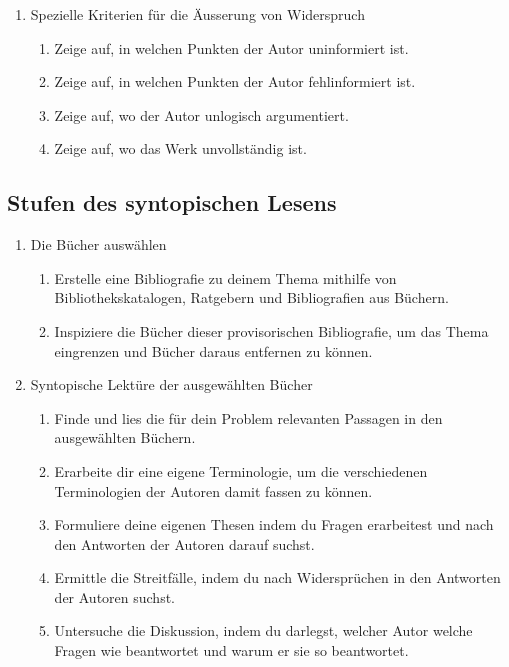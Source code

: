 \documentclass[a4paper,11pt]{scrartcl}
\begin{document}
\begin{itemize}
\begin{enumerate}
\begin{enumerate}
        \end{enumerate}
        \item Spezielle Kriterien für die Äusserung von Widerspruch
        \begin{enumerate}
            \item Zeige auf, in welchen Punkten der Autor uninformiert ist.
            \item Zeige auf, in welchen Punkten der Autor fehlinformiert ist.
            \item Zeige auf, wo der Autor unlogisch argumentiert.
            \item Zeige auf, wo das Werk unvollständig ist.
        \end{enumerate}
    \end{enumerate}
\end{itemize}

\subsection*{Stufen des syntopischen Lesens}

\begin{enumerate}
    \item Die Bücher auswählen
    \begin{enumerate}
        \item Erstelle eine Bibliografie zu deinem Thema mithilfe von Bibliothekskatalogen, Ratgebern und Bibliografien aus Büchern.
        \item Inspiziere die Bücher dieser provisorischen Bibliografie, um das Thema eingrenzen und Bücher daraus entfernen zu können.
    \end{enumerate}
    \item Syntopische Lektüre der ausgewählten Bücher
    \begin{enumerate}
        \item Finde und lies die für dein Problem relevanten Passagen in den ausgewählten Büchern.
        \item Erarbeite dir eine eigene Terminologie, um die verschiedenen Terminologien der Autoren damit fassen zu können.
        \item Formuliere deine eigenen Thesen indem du Fragen erarbeitest und nach den Antworten der Autoren darauf suchst.
        \item Ermittle die Streitfälle, indem du nach Widersprüchen in den Antworten der Autoren suchst.
        \item Untersuche die Diskussion, indem du darlegst, welcher Autor welche Fragen wie beantwortet und warum er sie so beantwortet.
    \end{enumerate}
\end{enumerate}

\newpage


\end{document}
